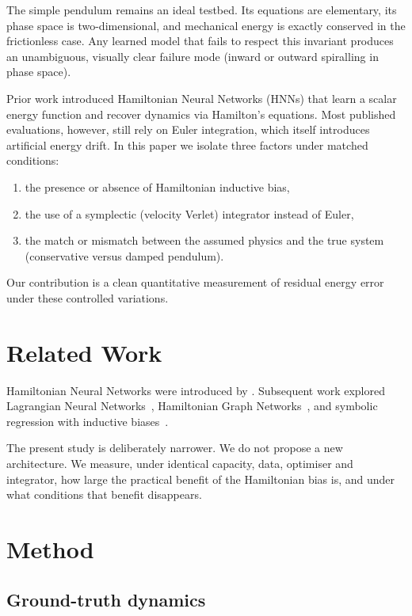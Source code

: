 \documentclass[11pt,a4paper]{article}
\begin{document}
The simple pendulum remains an ideal testbed. Its equations are elementary, its phase space is two-dimensional, and mechanical energy is exactly conserved in the frictionless case. Any learned model that fails to respect this invariant produces an unambiguous, visually clear failure mode (inward or outward spiralling in phase space).

Prior work introduced Hamiltonian Neural Networks (HNNs) that learn a scalar energy function and recover dynamics via Hamilton's equations. Most published evaluations, however, still rely on Euler integration, which itself introduces artificial energy drift. In this paper we isolate three factors under matched conditions:

\begin{enumerate}
  \item the presence or absence of Hamiltonian inductive bias,
  \item the use of a symplectic (velocity Verlet) integrator instead of Euler,
  \item the match or mismatch between the assumed physics and the true system (conservative versus damped pendulum).
\end{enumerate}

Our contribution is a clean quantitative measurement of residual energy error under these controlled variations.

\section{Related Work}

Hamiltonian Neural Networks were introduced by \citet{greydanus2019hamiltonian}. Subsequent work explored Lagrangian Neural Networks~\citep{lutter2019deep}, Hamiltonian Graph Networks~\citep{toth2019hamiltonian}, and symbolic regression with inductive biases~\citep{cranmer2020discovering}.

The present study is deliberately narrower. We do not propose a new architecture. We measure, under identical capacity, data, optimiser and integrator, how large the practical benefit of the Hamiltonian bias is, and under what conditions that benefit disappears.

\section{Method}

\subsection{Ground-truth dynamics}
\end{document}
